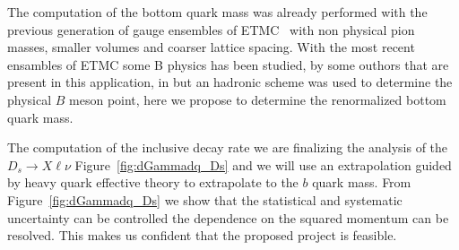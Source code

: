 
The computation of the bottom quark mass was already performed with
the previous generation of gauge ensembles of ETMC~\cite{ETM:2016nbo,ETM:2011zey} with
non physical pion masses, smaller volumes and coarser lattice spacing.
With the most recent ensambles of ETMC some B physics has been studied, by some outhors
that are present in this application, in \cite{Frezzotti:2024kqk}
but an hadronic scheme was used to determine the physical $B$ meson point, here we propose to 
determine the renormalized bottom quark mass.   


The computation of the   inclusive decay rate we are finalizing the
analysis of the $D_s\to X \ell \nu$ Figure~\ref{fig:dGammadq_Ds} and
we will use an extrapolation guided by heavy quark effective theory to extrapolate
to the $b$ quark mass.
From  Figure~\ref{fig:dGammadq_Ds} we show that the statistical and systematic
uncertainty can be controlled  the
dependence on the squared momentum can be resolved. This makes us
confident that the proposed project is feasible.

\endinput
